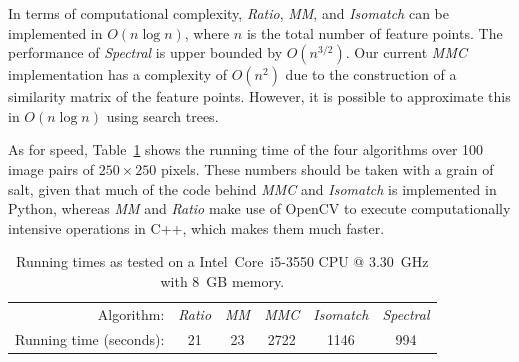 In terms of computational complexity, \emph{Ratio}, \emph{MM}, and 
\emph{Isomatch} can be implemented in $O(n\log n)$, where $n$ is the 
total number of feature points. The performance of \emph{Spectral} is 
upper bounded by $O(n^{3/2})$. Our current \emph{MMC} implementation has 
a complexity of $O(n^2)$ due to the construction of a similarity matrix 
of the feature points.  However, it is possible to approximate this in 
$O(n\log n)$ using search trees.  

As for speed, Table~\ref{table:running_times} shows the running time of 
the four algorithms over 100 image pairs of $250\!\times\!250$ pixels.  
These numbers should be taken with a grain of salt, given that much of 
the code behind \emph{MMC} and \emph{Isomatch} is implemented in Python, 
whereas \emph{MM} and \emph{Ratio} make use of OpenCV to execute 
computationally intensive operations in C++, which makes them much 
faster. 

\begin{table}[htb]
\caption{Running times as tested on a Intel\textregistered\ Core\texttrademark\ i5-3550 CPU @ 
3.30~GHz with 8~GB memory.}
\label{table:running_times}
	\centering
\begin{tabular}{r*{5}{c}}
\hline
	Algorithm: & \emph{Ratio} & \emph{MM} & \emph{MMC} %
& \emph{Isomatch} & \emph{Spectral}	\\
	\noalign{\smallskip} 
	Running time (seconds): & 21 & 23 & 2722 & 1146 & 994\\
	\hline
\end{tabular}
\end{table}

